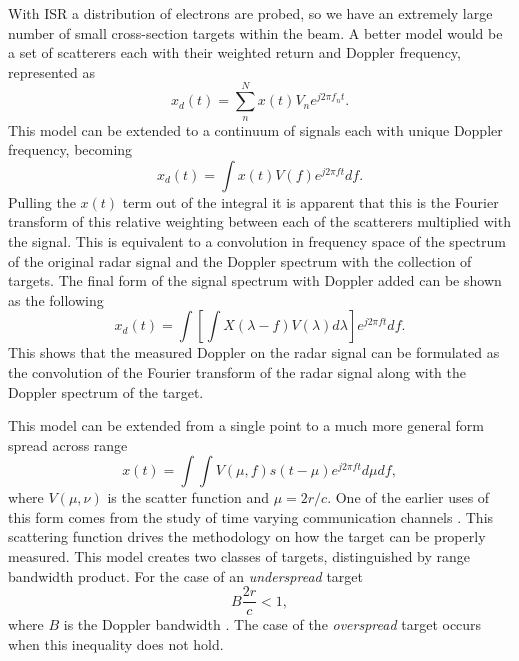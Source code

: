 With ISR a distribution of electrons are probed, so we have an extremely large number of small cross-section targets within the beam. A better model would be a set of scatterers each with their weighted return and Doppler frequency, represented as
\begin{equation}
\label{multiDop}
\displaystyle x_d(t) = \sum_{n}^{N} x(t)V_ne^{j2\pi f_{n} t}.
\end{equation}
This model can be extended to a continuum of signals each with unique Doppler frequency, becoming
\begin{equation}
\label{conDop}
x_d(t) = \int x(t) V(f)e^{j2\pi ft} df.
\end{equation}
Pulling the $x(t)$ term out of the integral it is apparent that this is the Fourier transform of this relative weighting between each of the scatterers multiplied with the signal.  This is equivalent to a convolution in frequency space of the spectrum of the original radar signal and the Doppler spectrum with the collection of targets.  
The final form of the signal spectrum with Doppler added can be shown as the following
\begin{equation}
\label{finalDop}
x_d(t) = \int \left[\int X(\lambda-f)V(\lambda)d\lambda\right] e^{j2\pi f t}df.
\end{equation}
This shows that the measured Doppler on the radar signal can be formulated as the convolution of the Fourier transform of the radar signal along with the Doppler spectrum of the target.

This model can be extended from a single point to a much more general form spread across range
\begin{equation}
\label{eqn:scateqn}
x(t)= \int \int V(\mu,f)s(t-\mu)e^{j2\pi f t} d \mu df,
\end{equation}
where $V(\mu,\nu)$ is the scatter function and $\mu=2r/c$. One of the earlier uses of this form comes from the study of time varying communication channels \cite{Kailath:1962jx,Kailath:1963gh}. This scattering function drives the methodology on how the target can be properly measured. 
This model creates two classes of targets, distinguished by range bandwidth product. For the case of an \textit{underspread} target
\begin{equation}
\label{eqn:trp}
B\frac{2r}{c}<1,
\end{equation}
where $B$ is the Doppler bandwidth \cite{Pfander:2015ea}. 
The case of the \textit{overspread} target occurs when this inequality does not hold.

